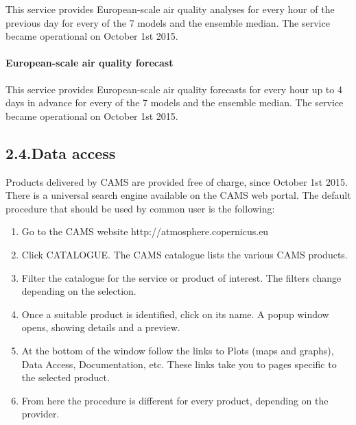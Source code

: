 \documentclass[9pt]{report}
\begin{document}
\noindent{}\mdbr
{}This service provides European-scale air quality analyses for every hour of the previous day for every of the 7 models and the ensemble median.
The service became operational on October 1st 2015.%

\paragraph{European-scale air quality forecast}\label{sec-european-scale-air-quality-forecast}%

\noindent{}\mdbr
{}This service provides European-scale air quality forecasts for every hour up to 4 days in advance for every of the 7 models and the ensemble median.
The service became operational on October 1st 2015.%

\subsection{2.4.\hspace*{0.5em}Data access}\label{sec-data-access}%

\noindent{}Products delivered by CAMS are provided free of charge, since October 1st 2015.
There is a universal search engine available on the CAMS web portal.
The default procedure that should be used by common user is the following:%

\begin{enumerate}[noitemsep,topsep=\mdcompacttopsep]%

\item{}Go to the CAMS website http://atmosphere.copernicus.eu%

\item{}Click CATALOGUE. The CAMS catalogue lists the various CAMS products.%

\item{}Filter the catalogue for the service or product of interest. The filters change depending on the selection.%

\item{}Once a suitable product is identified, click on its name. A popup window opens, showing details and a preview.%

\item{}At the bottom of the window follow the links to Plots (maps and graphs), Data Access, Documentation, etc. These links take you to pages specific to the selected product.%

\item{}From here the procedure is different for every product, depending on the provider.%
\end{enumerate}%
\end{document}
